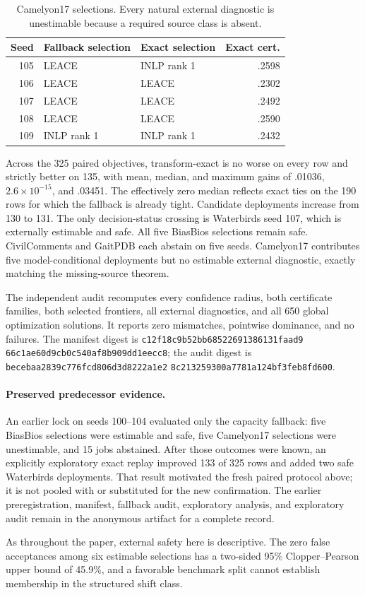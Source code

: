 \begin{table}[t]
\centering
\small
\setlength{\tabcolsep}{4.0pt}
\begin{tabular}{rllr}
\hline
Seed & Fallback selection & Exact selection & Exact cert. \\
\hline
105 & LEACE & INLP rank 1 & .2598 \\
106 & LEACE & LEACE & .2302 \\
107 & LEACE & LEACE & .2492 \\
108 & LEACE & LEACE & .2590 \\
109 & INLP rank 1 & INLP rank 1 & .2432 \\
\hline
\end{tabular}
\caption{Camelyon17 selections. Every natural external diagnostic is
unestimable because a required source class is absent.}
\label{supp:tab:cam-exact-selections}
\end{table}

Across the 325 paired objectives, transform-exact is no worse on every row and
strictly better on 135, with mean, median, and maximum gains of .01036,
$2.6\times10^{-15}$, and .03451. The effectively zero median reflects exact
ties on the 190 rows for which the fallback is already tight. Candidate
deployments increase from 130 to 131. The only decision-status crossing is
Waterbirds seed 107, which is externally estimable and safe. All five BiasBios
selections remain safe. CivilComments and GaitPDB each abstain on five seeds.
Camelyon17 contributes five model-conditional deployments but no estimable
external diagnostic, exactly matching the missing-source theorem.

The independent audit recomputes every confidence radius, both certificate
families, both selected frontiers, all external diagnostics, and all 650 global
optimization solutions. It reports zero mismatches, pointwise dominance, and
no failures. The manifest digest is
\texttt{c12f18c9b52bb68522691386131faad9}\allowbreak
\texttt{66c1ae60d9cb0c540af8b909dd1eecc8}; the audit digest is
\texttt{becebaa2839c776fcd806d3d8222a1e2}\allowbreak
\texttt{8c213259300a7781a124bf3feb8fd600}.

\paragraph{Preserved predecessor evidence.}
An earlier lock on seeds 100--104 evaluated only the capacity fallback: five
BiasBios selections were estimable and safe, five Camelyon17
selections were unestimable, and 15 jobs abstained. After those outcomes were
known, an explicitly exploratory exact replay improved 133 of 325 rows and
added two safe Waterbirds deployments. That result motivated the fresh paired
protocol above; it is not pooled with or substituted for the new confirmation.
The earlier preregistration, manifest, fallback audit, exploratory analysis,
and exploratory audit remain in the anonymous artifact for a complete record.

As throughout the paper, external safety here is descriptive. The zero false
acceptances among six estimable selections has a two-sided 95\% Clopper--Pearson
upper bound of 45.9\%, and a favorable benchmark split cannot establish
membership in the structured shift class.
